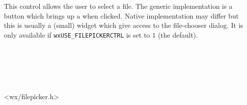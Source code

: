 
\section{}\label{wxfilepickerctrl}

This control allows the user to select a file. The generic implementation is
a button which brings up a  when clicked. Native implementation
may differ but this is usually a (small) widget which give access to the file-chooser
dialog.
It is only available if \texttt{wxUSE\_FILEPICKERCTRL} is set to $1$ (the default).


\\
\\
\\
\\


<wx/filepicker.h>




